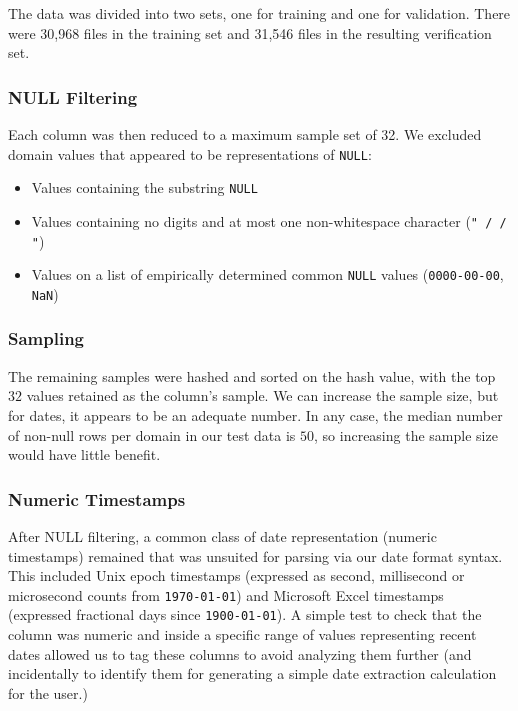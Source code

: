 The data was divided into two sets, one for training and one for validation. There were 30,968 files in the training set and 31,546 files in the resulting verification set.


\subsubsection{NULL Filtering}
Each column was then reduced to a maximum sample set of 32. We excluded domain values that appeared to be representations of \texttt{NULL}:
\begin{itemize}
\setlength\itemsep{0em}
\item Values containing the substring \texttt{NULL}
\item Values containing no digits and at most one non-whitespace character (\eg \texttt{" / / "})
\item Values on a list of empirically determined common \texttt{NULL} values (\eg \texttt{0000-00-00}, \texttt{NaN})
\end{itemize}

\subsubsection{Sampling}
The remaining samples were hashed and sorted on the hash value, with the top $32$ values retained as the column's sample. We can increase the sample size, but for dates, it appears to be an adequate number. In any case, the median number of non-null rows per domain in our test data is $50$, so increasing the sample size would have little benefit.

\subsubsection{Numeric Timestamps}
After NULL filtering, a common class of date representation (numeric timestamps) remained that was unsuited for parsing via our date format syntax. This included Unix epoch timestamps (expressed as second, millisecond or microsecond counts from \texttt{1970-01-01}) and Microsoft Excel timestamps (expressed fractional days since \texttt{1900-01-01}). A simple test to check that the column was numeric and inside a specific range of values representing recent dates allowed us to tag these columns to avoid analyzing them further (and incidentally to identify them for generating a simple date extraction calculation for the user.)



